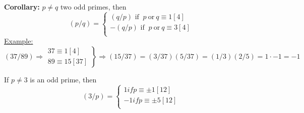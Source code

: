 \documentclass{report}
\begin{document}
\textbf{Corollary:} $p\neq q$ two odd primes, then	\[(p/q)=\left\{ 
																														\begin{array}{lcl}
																																(q/p) \text{ if }\: p \:\text{or} \:q \equiv 1[4]\\
																																-(q/p) \text{ if }\: p \:\text{or} \:q \equiv 3[4]\\
																														\end{array}
																														\right.\]
\underline{Example:} \[(37/89)\Rightarrow \left. 
																				\begin{array}{lcl}
																				37 \equiv 1[4]\\ 
																				89 \equiv 15 [37]
																				\end{array}
																				\right \} \Rightarrow (15/37)=(3/37)(5/37)=(1/3)(2/5)=1\cdot -1 = -1\]
\begin{thm} If $p\neq 3$ is an odd prime, then \[ (3/p)=\left\{
																												\begin{array}{lcl}
																												1 if p\equiv \pm 1 [12]\\
																												-1 if p\equiv \pm 5 [12]\\
																												\end{array}
																												\right.\]
\end{thm}

																																				


\newpage
\end{document}
